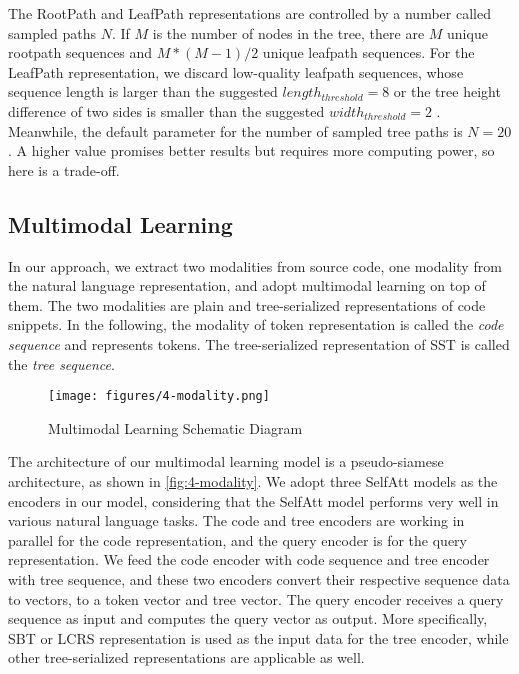 \documentclass[conference]{IEEEtran}
\begin{document}
The RootPath and LeafPath representations are controlled by a number called sampled paths $N$. If $M$ is the number of nodes in the tree, there are $M$ unique rootpath sequences and $M*(M-1)/2$ unique leafpath sequences.
For the LeafPath representation, we discard low-quality leafpath sequences, whose sequence length is larger than the suggested $length_{threshold}=8$ or the tree height difference of two sides is smaller than the suggested $width_{threshold}=2$ \cite{Alon2018code2vecLD,Alon2018code2seqGS}. Meanwhile, the default parameter for the number of sampled tree paths is $N=20$. A higher value promises better results but requires more computing power, so here is a trade-off.

\subsection{Multimodal Learning}

In our approach, we extract two modalities from source code, one modality from the natural language representation, and adopt multimodal learning on top of them. The two modalities are plain and tree-serialized representations of code snippets. In the following, the modality of token representation is called the \emph{code sequence} and represents tokens. The tree-serialized representation of SST is called the \emph{tree sequence}.

\begin{figure}[!htb]
  \centering
  \texttt{[image: figures/4-modality.png]}
  \caption{Multimodal Learning Schematic Diagram}
  \label{fig:4-modality}
\end{figure}

The architecture of our multimodal learning model is a pseudo-siamese architecture, as shown in \autoref{fig:4-modality}. We adopt three SelfAtt models as the encoders in our model, considering that the SelfAtt model performs very well in various natural language tasks. The code and tree encoders are working in parallel for the code representation, and the query encoder is for the query representation. We feed the code encoder with code sequence and tree encoder with tree sequence, and these two encoders convert their respective sequence data to vectors, to a token vector and tree vector. The query encoder receives a query sequence as input and computes the query vector as output. More specifically, SBT or LCRS representation is used as the input data for the tree encoder, while other tree-serialized representations are applicable as well.
\end{document}
